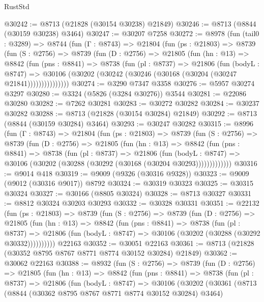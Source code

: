 \begin{lexlean}{RustStd}
\begin{coremodule}
@30242 := @8713 (@21828 (@30154 @30238) @21849)
@30246 := @8713 (@8844 (@30159 @30238) @3464)
@30247 := @30207 @7258
@30272 := @8978
    (fun (tail0 : @3289) =>
    @8744
      (fun (Γ : @8743) =>
      @21804
        (fun (ps : @21803) =>
        @8739
          (fun (S : @2756) =>
          @8739
            (fun (D : @2756) =>
            @21805
              (fun (hn : @13) =>
              @8842
                (fun (pns : @8841) =>
                @8738
                  (fun (pl : @8737) =>
                  @21806
                    (fun (bodyL : @8747) =>
                    @30106 (@30202 (@30242 (@30246 (@30168 (@30204 (@30247 @21841)))))))))))))))
@30274 := @3290 @7347 @3358
@30276 := @5957 @30274 @3297
@30280 := @3324 (@5826 (@3284 @30276)) @3544
@30281 := @22086 @30280
@30282 := @7262 @30281
@30283 := @30272 @30282
@30284 := @30237 @30282
@30288 := @8713 (@21828 (@30154 @30284) @21849)
@30292 := @8713 (@8844 (@30159 @30284) @3464)
@30293 := @30247 @30282
@30315 := @8996
    (fun (Γ : @8743) =>
    @21804
      (fun (ps : @21803) =>
      @8739
        (fun (S : @2756) =>
        @8739
          (fun (D : @2756) =>
          @21805
            (fun (hn : @13) =>
            @8842
              (fun (pns : @8841) =>
              @8738
                (fun (pl : @8737) =>
                @21806
                  (fun (bodyL : @8747) =>
                  @30106 (@30202 (@30288 (@30292 (@30168 (@30204 @30293)))))))))))))
@30316 := @9014 @418
@30319 := @9009 (@9326 (@30316 @9328))
@30323 := @9009 (@9012 (@30316 @9017)) @8792
@30324 := @30319 @30323
@30325 := @30315 @30324
@30327 := @30166 (@8805 @30324)
@30328 := @8713 @30327
@30331 := @8812 @30324 @30203 @30293
@30332 := @30328 @30331
@30351 := @22132
    (fun (ps : @21803) =>
    @8739
      (fun (S : @2756) =>
      @8739
        (fun (D : @2756) =>
        @21805
          (fun (hn : @13) =>
          @8842
            (fun (pns : @8841) =>
            @8738
              (fun (pl : @8737) =>
              @21806 (fun (bodyL : @8747) => @30106 (@30202 (@30288 (@30292 @30332))))))))))
    @22163
@30352 := @30051 @22163
@30361 := @8713 (@21828 (@30352 @8795 @8767 @8771 @8774 @30152 @30284) @21849)
@30362 := @30062 @22163
@30388 := @8932
    (fun (S : @2756) =>
    @8739
      (fun (D : @2756) =>
      @21805
        (fun (hn : @13) =>
        @8842
          (fun (pns : @8841) =>
          @8738
            (fun (pl : @8737) =>
            @21806
              (fun (bodyL : @8747) =>
              @30106
                (@30202
                  (@30361
                    (@8713
                      (@8844 (@30362 @8795 @8767 @8771 @8774 @30152 @30284) @3464)

\end{coremodule}
\end{lexlean}
